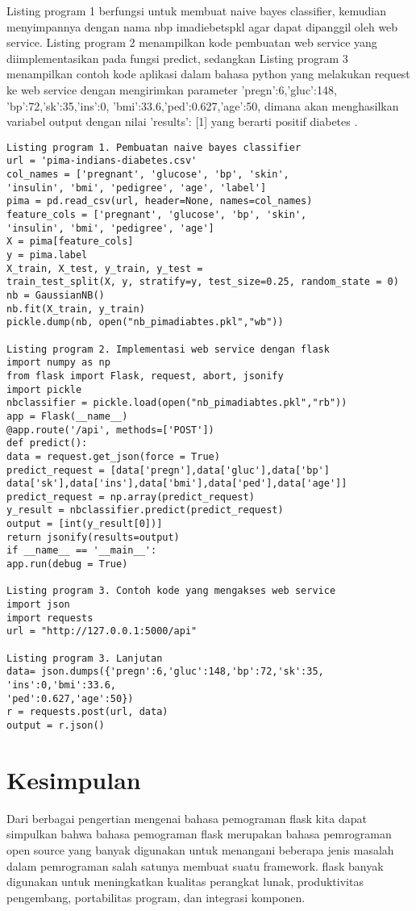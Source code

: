 \documentclass[12pt]{article}
\begin{document}
Listing program 1 berfungsi untuk membuat naive bayes classifier, kemudian menyimpannya dengan nama nbp imadiebetspkl agar dapat dipanggil oleh web service. Listing program 2 menampilkan kode pembuatan web service yang diimplementasikan pada fungsi predict, sedangkan Listing program 3 menampilkan contoh kode aplikasi dalam bahasa python yang melakukan request ke web service dengan mengirimkan parameter 'pregn':6,'gluc':148,
'bp':72,'sk':35,'ins':0,
'bmi':33.6,'ped':0.627,'age':50, dimana akan menghasilkan variabel output dengan nilai {'results': [1]} yang berarti positif diabetes \cite{setyawan2017implementasi}.

\begin{verbatim}
Listing program 1. Pembuatan naive bayes classifier
url = 'pima-indians-diabetes.csv'
col_names = ['pregnant', 'glucose', 'bp', 'skin',
'insulin', 'bmi', 'pedigree', 'age', 'label']
pima = pd.read_csv(url, header=None, names=col_names)
feature_cols = ['pregnant', 'glucose', 'bp', 'skin',
'insulin', 'bmi', 'pedigree', 'age']
X = pima[feature_cols]
y = pima.label
X_train, X_test, y_train, y_test =
train_test_split(X, y, stratify=y, test_size=0.25, random_state = 0)
nb = GaussianNB()
nb.fit(X_train, y_train)
pickle.dump(nb, open("nb_pimadiabtes.pkl","wb"))

Listing program 2. Implementasi web service dengan flask
import numpy as np
from flask import Flask, request, abort, jsonify
import pickle
nbclassifier = pickle.load(open("nb_pimadiabtes.pkl","rb"))
app = Flask(__name__)
@app.route('/api', methods=['POST'])
def predict():
data = request.get_json(force = True)
predict_request = [data['pregn'],data['gluc'],data['bp']
data['sk'],data['ins'],data['bmi'],data['ped'],data['age']]
predict_request = np.array(predict_request)
y_result = nbclassifier.predict(predict_request)
output = [int(y_result[0])]
return jsonify(results=output)
if __name__ == '__main__':
app.run(debug = True)

Listing program 3. Contoh kode yang mengakses web service
import json
import requests
url = "http://127.0.0.1:5000/api"

Listing program 3. Lanjutan
data= json.dumps({'pregn':6,'gluc':148,'bp':72,'sk':35,
'ins':0,'bmi':33.6,
'ped':0.627,'age':50})
r = requests.post(url, data)
output = r.json()
\end{verbatim}






\section{Kesimpulan}
Dari berbagai pengertian mengenai bahasa pemograman flask kita dapat simpulkan bahwa bahasa pemograman flask merupakan bahasa pemrograman open source yang banyak digunakan untuk menangani beberapa jenis masalah dalam pemrograman salah satunya membuat suatu framework. flask banyak digunakan untuk meningkatkan kualitas perangkat lunak, produktivitas pengembang, portabilitas program, dan integrasi komponen.
\end{document}
